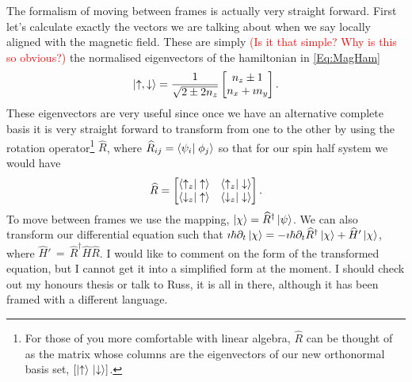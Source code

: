 The formalism of moving between frames is actually very straight forward.
First let's calculate exactly the vectors we are talking about when we say locally aligned with the magnetic field.
These are simply \textcolor{red}{(Is it that simple? Why is this so obvious?)} the normalised eigenvectors of the hamiltonian in \autoref{Eq:MagHam}
\begin{equation}
    \ket{\uparrow,\downarrow} = \frac{1}{\sqrt{2\pm 2n_z}} \begin{bmatrix} n_z \pm 1\\
                                                                           n_x + \imath n_y \end{bmatrix}.
\end{equation}
These eigenvectors are very useful since once we have an alternative complete basis it is very straight forward to transform from one to the other by using the rotation operator\footnote{For those of you more comfortable with linear algebra, $\widehat{R}$ can be thought of as the matrix whose columns are the eigenvectors of our new orthonormal basis set, \ie $\left[\ket{\uparrow}\, \ket{\downarrow}\right]$.} $\widehat{R}$, where $\widehat{R}_{ij} = \bra{\psi_i}\left.\phi_j\right>$ so that for our spin half system we would have
\begin{equation}
    \widehat{R} = \begin{bmatrix} \bra{\uparrow_z}\left.\uparrow\right>   & \bra{\uparrow_z}\left.\downarrow\right>\\
                              \bra{\downarrow_z}\left.\uparrow\right> & \bra{\downarrow_z}\left.\downarrow\right>
              \end{bmatrix}.
\end{equation}
To move between frames we use the mapping, $\ket{\chi} = \widehat{R}^{\dagger} \ket{\psi}$.
We can also transform our differential equation such that $\imath\hbar \partial_t \ket{\chi} = -\imath\hbar \partial_t\widehat{R}^{\dagger}\ket{\chi} + \widehat{H}' \ket{\chi}$, where $\widehat{H}'\,=\,\widehat{R}^{\dagger} \widehat{H} \widehat{R}$.
I would like to comment on the form of the transformed equation, but I cannot get it into a simplified form at the moment. I should check out my honours thesis or talk to Russ, it is all in there, although it has been framed with a different language.

